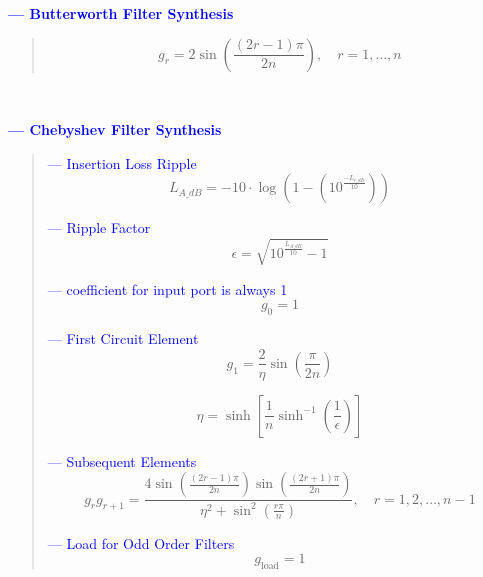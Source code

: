 \documentclass[10pt,conference]{IEEEtran}
\begin{document}
\textcolor{blue}{ \textbf{ --- Butterworth Filter Synthesis} }
\begin{quote}
	\begin{equation}\label{eq:gr_sine}
	g_r = 2 \sin\left( \frac{(2r - 1)\pi}{2n} \right), \quad r = 1, \ldots, n
	\end{equation}
\end{quote}

$~$
$~$


\textcolor{blue}{ \textbf{ --- Chebyshev Filter Synthesis} }
\begin{quote}

	\textcolor{blue}{ --- Insertion Loss Ripple}
	\begin{equation}\label{eq:insertion_loss}
	L_{A\_dB} = -10 \cdot \log \left( 1 - \left(10^{\frac{-L_{r\_dB}}{10}} \right) \right)
	\end{equation}

	\textcolor{blue}{ --- Ripple Factor}
	\begin{equation}\label{eq:ripple_factor}
	\epsilon = \sqrt{10^{\frac{L_{A\_dB}}{10}} - 1}
	\end{equation}

	\textcolor{blue}{ --- coefficient for input port is always 1}
	\begin{equation}\label{eq:g0}
	g_0 = 1
	\end{equation}

	\textcolor{blue}{ --- First Circuit Element }
	\begin{equation}\label{eq:g1}
	g_1 = \frac{2}{\eta} \sin\left( \frac{\pi}{2n} \right)
	\end{equation}

	\begin{equation}\label{eq:eta}
	\eta = \sinh \left[ \frac{1}{n} \sinh^{-1} \left( \frac{1}{\epsilon} \right) \right]
	\end{equation}

	\textcolor{blue}{ --- Subsequent Elements }
	\begin{equation}\label{eq:gr}
	g_r g_{r+1} = \frac{4 \sin \left( \frac{(2r - 1)\pi}{2n} \right) \sin \left( \frac{(2r + 1)\pi}{2n} \right)}{\eta^2 + \sin^2 \left( \frac{r\pi}{n} \right)}, \quad r = 1, 2, \ldots, n-1
	\end{equation}

	\textcolor{blue}{ --- Load for Odd Order Filters }
	\begin{equation}\label{eq:gload_odd}
	g_{\text{load}} = 1
	\end{equation}


\end{quote}
\end{document}
